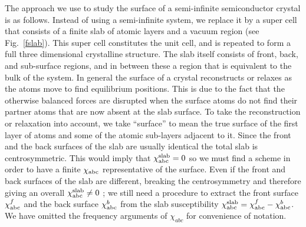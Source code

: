 \documentclass[floatfix,prb,aps,superscriptaddress,11pt,preprint,letterpaper]{revtex4}
\begin{document}

The approach we use to study the surface of a semi-infinite
semiconductor crystal is as follows. Instead of using a
semi-infinite system, we replace it by a super cell that 
{\color{red} consists} of a finite
slab of atomic layers and a vacuum region (see Fig.~\ref{fslab}). This
super cell {\color{red} constitutes the unit cell, and}
is repeated to form a full three dimensional crystalline structure.
The slab itself consists of {\color{red} front, back, and 
sub-surface} regions, and in between these
a region that is equivalent to {\color{red} the}
bulk of the system. 
In general the surface of a crystal reconstructs or relaxes as the atoms
move to find equilibrium positions. This is due to the fact that
the otherwise
balanced forces are disrupted when the surface atoms do not find their 
partner atoms that are now absent at the {\color{red} slab surface.} 
To take the reconstruction or relaxation into account, 
we take ``surface'' to mean
the true surface of the first layer of {\color{red} atoms} and
some of the atomic sub-layers adjacent to it.
Since the front and the back
surfaces of the slab are usually identical the total slab is
centrosymmetric. This would imply that 
$\chi^{\mathrm{slab}}_{\mathrm{a}\mathrm{b}\mathrm{c}}=0$ {\color{red} so} we must
find a scheme 
in order to have a finite $\chi_{\mathrm{a}\mathrm{b}\mathrm{c}}$ representative of the
surface. Even if the front and back surfaces of the slab 
are different, breaking the centrosymmetry and therefore giving an
overall $\chi^{\mathrm{slab}}_{\mathrm{a}\mathrm{b}\mathrm{c}}\ne 0${\color{red} ;} we still
need a procedure to extract the front surface $\chi^f_{\mathrm{a}\mathrm{b}\mathrm{c}}$
and the back surface $\chi^b_{\mathrm{a}\mathrm{b}\mathrm{c}}$ from the slab
susceptibility 
$\chi^{\mathrm{slab}}_{\mathrm{a}\mathrm{b}\mathrm{c}}=\chi^f_{\mathrm{a}\mathrm{b}\mathrm{c}}-\chi^b_{\mathrm{a}\mathrm{b}\mathrm{c}}$.
We have omitted the frequency arguments of $\chi_{abc}$ for 
{\color{red} convenience of} notation. 
\end{document}
